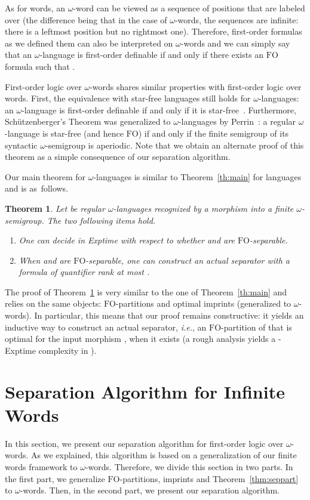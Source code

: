 \documentclass{CSML}
\newcommand{\fo}{\ensuremath{\text{FO}}\xspace}
\newcommand\iword{\ensuremath{\omega}-word\xspace}
\newcommand\ilang{\ensuremath{\omega}-language\xspace}
\newcommand\iwords{\ensuremath{\omega}-words\xspace}
\newcommand\ilangs{\ensuremath{\omega}-languages\xspace}
\newcommand\isemi{\ensuremath{\omega}-semigroup\xspace}
\theoremstyle{plain}
\newtheorem{theorem}[thm]{Theorem}
\begin{document}
As for words, an \iword can be viewed as a sequence of positions that
are labeled over  (the difference being that in the case of
\iwords, the sequences are infinite: there is a leftmost position but
no rightmost one). Therefore, first-order formulas as we defined them can
also be interpreted on \iwords and we can simply say that an \ilang
 is first-order definable if and only if there
exists an \fo formula  such that .

First-order logic over \iwords shares similar properties with
first-order logic over words. First, the equivalence with star-free
languages still holds for \ilangs: an \ilang is first-order definable
if and only if it is
star-free~\cite{Ladner:Application-model-theoretic-games:1977:a,tfo}.
Furthermore, Schützenberger's Theorem was generalized to \ilangs by
Perrin~\cite{pfo}: a regular \ilang is star-free (and hence \fo) if
and only if the finite semigroup  of its syntactic \isemi
 is aperiodic. Note that we obtain an alternate proof
of this theorem as a simple consequence of our separation algorithm.

Our main theorem for \ilangs is similar to Theorem~\ref{th:main} for
languages and is as~follows.

\begin{theorem} \label{th:main-i}
  Let  be regular \ilangs recognized by a morphism
   into a finite \isemi. The
  two following items hold.
  \begin{enumerate}
  \item One can decide in {\sc Exptime} with respect to  whether
     and  are \fo-separable.
  \item When  and  are \fo-separable, one can construct an
    actual separator with a formula of quantifier rank at most
    .
  \end{enumerate}
\end{theorem}\smallskip

\noindent The proof of Theorem~\ref{th:main-i} is very similar to the one of
Theorem~\ref{th:main} and relies on the same objects: \fo-partitions
and optimal imprints (generalized to \iwords). In particular, this
means that our proof remains constructive: it yields an inductive way
to construct an actual separator, \emph{i.e.}, an \fo-partition of 
that is optimal for the input morphism , when it exists (a
rough analysis yields a -{\sc Exptime} complexity in ).

\section{Separation Algorithm for Infinite Words}
\label{sec:omegasep}
In this section, we present our separation algorithm for first-order
logic over \iwords. As we explained, this algorithm is based on a
generalization of our finite words framework to \iwords. Therefore,
we divide this section in two parts. In the first part, we generalize
\fo-partitions, imprints and Theorem~\ref{thm:seppart} to
\iwords. Then, in the second part, we present our separation algorithm.
\end{document}
